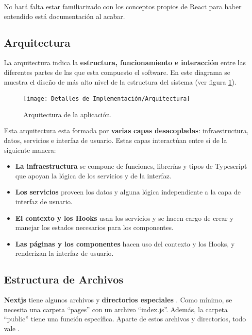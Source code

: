 \documentclass[12pt,twoside,titlepage]{report}
\begin{document}
No hará falta estar familiarizado con los conceptos propios de React para haber entendido está documentación al acabar.

\subsection{Arquitectura}
\label{sec:arquitectura}

La arquitectura indica la \textbf{estructura, funcionamiento e interacción} entre las diferentes partes de las que esta compuesto el software. En este diagrama se muestra el diseño de más alto nivel de la estructura del sistema (ver figura \ref{fig:Arquitectura}).

\begin{figure}[H]
    \centering
    \texttt{[image: Detalles de Implementación/Arquitectura]}
    \caption{Arquitectura de la aplicación.}
    \label{fig:Arquitectura}
\end{figure}

Esta arquitectura esta formada por \textbf{varias capas desacopladas}: infraestructura, datos, servicios e interfaz de usuario. Estas capas interactúan entre sí de la siguiente manera:

\begin{itemize}
    \item \textbf{La infraestructura} se compone de funciones, librerías y tipos de Typescript que apoyan la lógica de los servicios y de la interfaz.
    \item \textbf{Los servicios} proveen los datos y alguna lógica independiente a la capa de interfaz de usuario.
    \item \textbf{El contexto y los Hooks} usan los servicios y se hacen cargo de crear y manejar los estados necesarios para los componentes.
    \item \textbf{Las páginas y los componentes} hacen uso del contexto y los Hooks, y renderizan la interfaz de usuario.
\end{itemize}

\subsection{Estructura de Archivos}
\label{sec:archivos}

\textbf{Nextjs} tiene algunos archivos y \textbf{directorios especiales} \cite{reactArchivos}. Como mínimo, se necesita una carpeta ``pages'' con un archivo ``index.js''. Además, la carpeta ``public'' tiene una función específica. Aparte de estos archivos y directorios, todo vale \cite{nextjs2}.
\end{document}
